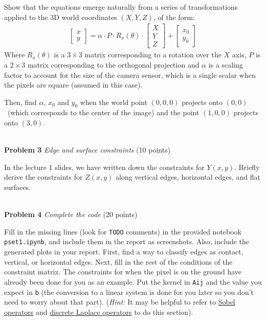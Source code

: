 \documentclass[11pt]{article}
\newcommand{\hwproblem}[2] {\noindent \\ {\bf #1} {\it #2}}
\begin{document}
Show that the  equations emerge naturally from a series of transformations
applied to the 3D world coordinates $(X,Y,Z)$, of the form:
\begin{gather}
\left[
  \begin{array}{c}
    x \\
    y
  \end{array}
\right] = \alpha \cdot P \cdot R_x(\theta) \cdot
\left[
  \begin{array}{ccc}
    X \\
    Y \\
    Z
  \end{array}
\right] +
\left[
  \begin{array}{c}
    x_0 \\
    y_0
  \end{array}
\right]
\end{gather}
Where $R_x(\theta)$ is a $3\times 3$ matrix corresponding to a rotation over the $X$ axis, $P$ is a $2 \times 3$ matrix corresponding to the orthogonal projection and $\alpha$ is  a scaling factor to account for the size
of the
camera sensor, which is a single scalar when the pixels are square (assumed in this case).  

Then, find $\alpha$, $x_0$ and $y_0$ when the world point $(0, 0, 0)$ projects onto  $(0, 0)$ \ (which corresponds to the center of the image) and the point $(1, 0, 0)$ projects onto $(3, 0)$.



\hwproblem{Problem 3}{Edge and surface constraints} (10 points)

In the lecture 1 slides, we have written down the constraints for $Y(x, y)$. Briefly derive the constraints for $Z(x, y)$ along vertical edges, horizontal edges, and flat surfaces.

\newpage
\hwproblem{Problem 4}{Complete the code} (20 points)

Fill in the missing lines (look for  \texttt{TODO}  comments) in the provided notebook \texttt{pset1.ipynb}, and include them in the report as screenshots. Also, include the generated plots in your report. First, find a way to classify edges as contact, vertical, or horizontal edges. Next, fill in the rest of the conditions of the constraint matrix. The constraints for when the pixel is on the ground have already been done for you as an example. Put the kernel in \texttt{Aij} and the value you expect in \texttt{b} (the conversion to a linear system is done for you later so you don't need to worry about that part). (\textit{Hint:} It may be helpful to refer to \href{https://en.wikipedia.org/wiki/Sobel_operator}{Sobel operators} and \href{https://en.wikipedia.org/wiki/Discrete_Laplace_operator}{discrete Laplace operators} to do this section).
\end{document}
